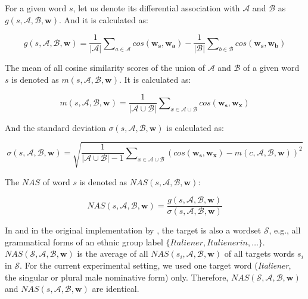 For a given word $s$, let us denote its differential association with $\mathcal{A}$ and $\mathcal{B}$ as $g(s, \mathcal{A}, \mathcal{B}, \boldsymbol{w})$. And it is calculated as:

\begin{equation}
g(s, \mathcal{A}, \mathcal{B}, \boldsymbol{w}) = \frac{1}{|\mathcal{A}|} \sum\nolimits_{a \in \mathcal{A}} cos(\boldsymbol{w_s}, \boldsymbol{w_a}) - \frac{1}{|\mathcal{B}|} \sum\nolimits_{b \in \mathcal{B}} cos(\boldsymbol{w_s}, \boldsymbol{w_b})
\end{equation}

The mean of all cosine similarity scores of the union of $\mathcal{A}$ and $\mathcal{B}$ of a given word $s$ is denoted as $m(s, \mathcal{A}, \mathcal{B}, \boldsymbol{w})$. It is calculated as:

\begin{equation}
m(s, \mathcal{A}, \mathcal{B}, \boldsymbol{w}) = \frac{1}{|\mathcal{A} \cup \mathcal{B}|} \sum\nolimits_{x \in \mathcal{A} \cup \mathcal{B}} cos(\boldsymbol{w_s}, \boldsymbol{w_x})
\end{equation}

And the standard deviation $\sigma(s, \mathcal{A}, \mathcal{B}, \boldsymbol{w})$ is calculated as:

\begin{equation}
\sigma(s, \mathcal{A}, \mathcal{B}, \boldsymbol{w}) = \sqrt{\frac{1}{|\mathcal{A} \cup \mathcal{B}| - 1} \sum\nolimits_{x \in \mathcal{A} \cup \mathcal{B}} (cos(\boldsymbol{w_s}, \boldsymbol{w_x}) - m(c, \mathcal{A}, \mathcal{B}, \boldsymbol{w}))^2}
\end{equation}

The $NAS$ of word $s$ is denoted as $NAS(s, \mathcal{A}, \mathcal{B}, \boldsymbol{w})$:

\begin{equation}
NAS(s, \mathcal{A}, \mathcal{B}, \boldsymbol{w}) = \frac{g(s, \mathcal{A}, \mathcal{B}, \boldsymbol{w})}{\sigma(s, \mathcal{A}, \mathcal{B}, \boldsymbol{w})}
\end{equation}

In \textcite{mueller:2023:DRN} and in the original implementation by \textcite{caliskan:2017:S}, the target is also a wordset $\mathcal{S}$, e.g., all grammatical forms of an ethnic group label $\{ Italiener,  Italienerin, \ldots \}$. $NAS(\mathcal{S}, \mathcal{A},\mathcal{B}, \boldsymbol{w})$ is the average of all $NAS(s_{i}, \mathcal{A}, \mathcal{B}, \boldsymbol{w})$ of all targets words $s_{i}$ in $\mathcal{S}$. For the current experimental setting, we used one target word (\textit{Italiener}, the singular or plural male nominative form) only. Therefore, $NAS(\mathcal{S}, \mathcal{A}, \mathcal{B}, \boldsymbol{w})$ and $NAS(s, \mathcal{A}, \mathcal{B}, \boldsymbol{w})$ are identical.

